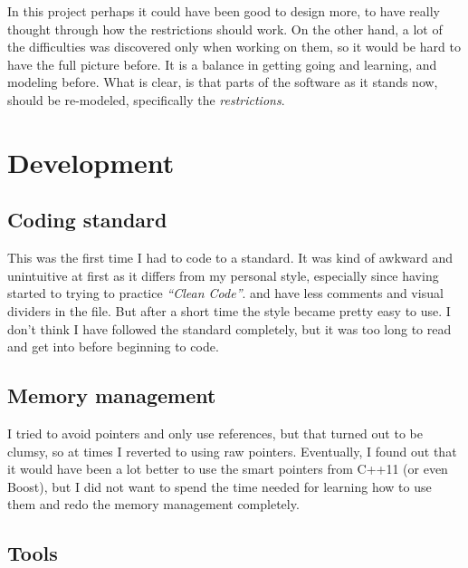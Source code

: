 \documentclass[../main.tex]{subfiles}
\begin{document}
In this project perhaps it could have been good to design more, to have really thought through how the restrictions should work. On the other hand, a lot of the difficulties was discovered only when working on them, so it would be hard to have the full picture before. It is a balance in getting going and learning, and modeling before. What is clear, is that parts of the software as it stands now, should be re-modeled, specifically the \textit{restrictions}.


\section{Development}

\subsection{Coding standard}
This was the first time I had to code to a standard. It was kind of awkward and unintuitive at first as it differs from my personal style, especially since having started to trying to practice \textit{``Clean Code''}. and have less comments and visual dividers in the file. But after a short time the style became pretty easy to use. I don't think I have followed the standard completely, but it was too long to read and get into before beginning to code.

\subsection{Memory management}
I tried to avoid pointers and only use references, but that turned out to be clumsy, so at times I reverted to using raw pointers. Eventually, I found out that it would have been a lot better to use the smart pointers from C++11 (or even Boost), but I did not want to spend the time needed for learning how to use them and redo the memory management completely. 

\subsection{Tools}
\end{document}
